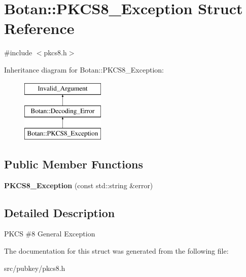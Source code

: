 \hypertarget{structBotan_1_1PKCS8__Exception}{\section{Botan\-:\-:P\-K\-C\-S8\-\_\-\-Exception Struct Reference}
\label{structBotan_1_1PKCS8__Exception}
}


{\ttfamily \#include $<$pkcs8.\-h$>$}

Inheritance diagram for Botan\-:\-:P\-K\-C\-S8\-\_\-\-Exception\-:\begin{figure}[H]
\begin{center}
\leavevmode
\includegraphics[height=3.000000cm]{structBotan_1_1PKCS8__Exception}
\end{center}
\end{figure}
\subsection*{Public Member Functions}
\begin{DoxyCompactItemize}
\item 
\hypertarget{structBotan_1_1PKCS8__Exception_a00c406dee71c76453146b03fed9b19ac}{{\bfseries P\-K\-C\-S8\-\_\-\-Exception} (const std\-::string \&error)}\label{structBotan_1_1PKCS8__Exception_a00c406dee71c76453146b03fed9b19ac}

\end{DoxyCompactItemize}


\subsection{Detailed Description}
P\-K\-C\-S \#8 General Exception 

The documentation for this struct was generated from the following file\-:\begin{DoxyCompactItemize}
\item 
src/pubkey/pkcs8.\-h\end{DoxyCompactItemize}
